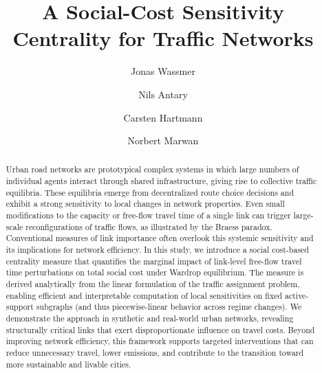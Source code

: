 \documentclass[twocolumn,english,groupedaddress, superscriptaddress,aps,pre,10pt,floatfix]{revtex4-2}
\providecommand{\DIFaddbegin}{} %
\providecommand{\DIFaddend}{} %
\providecommand{\DIFdelbegin}{} %
\providecommand{\DIFdelend}{} %
\newcommand{\DIFscaledelfig}{0.5}
\newlength{\DIFdelgraphicswidth} %
\newlength{\DIFdelgraphicsheight} %
\newcommand{\DIFaddincludegraphics}[2][]{{\color{blue}\fbox{\DIFOincludegraphics[#1]{#2}}}} %
\newcommand{\DIFdelincludegraphics}[2][]{%
\sbox{\DIFdelgraphicsbox}{\DIFOincludegraphics[#1]{#2}}%
\settoboxwidth{\DIFdelgraphicswidth}{\DIFdelgraphicsbox} %
\settoboxtotalheight{\DIFdelgraphicsheight}{\DIFdelgraphicsbox} %
\scalebox{\DIFscaledelfig}{%
\parbox[b]{\DIFdelgraphicswidth}{\usebox{\DIFdelgraphicsbox}\\[-\baselineskip] \rule{\DIFdelgraphicswidth}{0em}}\llap{\resizebox{\DIFdelgraphicswidth}{\DIFdelgraphicsheight}{%
\setlength{\unitlength}{\DIFdelgraphicswidth}%
\begin{picture}(1,1)%
\thicklines\linethickness{2pt} %
{\color[rgb]{1,0,0}\put(0,0){\framebox(1,1){}}}%
{\color[rgb]{1,0,0}\put(0,0){\line( 1,1){1}}}%
{\color[rgb]{1,0,0}\put(0,1){\line(1,-1){1}}}%
\end{picture}%
}\hspace*{3pt}}} %
} %
\DeclareRobustCommand{\DIFaddbegin}{\DIFOaddbegin \let\includegraphics\DIFaddincludegraphics} %
\DeclareRobustCommand{\DIFaddend}{\DIFOaddend \let\includegraphics\DIFOincludegraphics} %
\DeclareRobustCommand{\DIFdelbegin}{\DIFOdelbegin \let\includegraphics\DIFdelincludegraphics} %
\DeclareRobustCommand{\DIFdelend}{\DIFOaddend \let\includegraphics\DIFOincludegraphics} %
\begin{document}
\title{A Social-Cost Sensitivity Centrality for Traffic Networks}

\author{Jonas Wassmer}
\author{Nils Antary}
\DIFdelbegin %
\DIFdelend \DIFaddbegin {}
\DIFaddend \author{Carsten Hartmann}
\author{Norbert Marwan}


\begin{abstract}
Urban road networks are prototypical complex systems in which large numbers of individual agents interact through shared infrastructure, giving rise to collective traffic equilibria. These equilibria emerge from decentralized route choice decisions and exhibit a strong sensitivity to local changes in network properties. Even small modifications to the capacity or free-flow travel time of a single link can trigger large-scale reconfigurations of traffic flows, as illustrated by the Braess paradox. Conventional measures of link importance often overlook this systemic sensitivity and its implications for network efficiency. In this study, we introduce a social cost-based centrality measure that quantifies the marginal impact of link-level free-flow travel time perturbations on total social cost under Wardrop equilibrium. The measure is derived analytically from the linear formulation of the traffic assignment problem, enabling efficient and interpretable computation of local sensitivities on fixed active-support subgraphs (and thus piecewise-linear behavior across regime changes). We demonstrate the approach in synthetic and real-world urban networks, revealing structurally critical links that exert disproportionate influence on travel costs. Beyond improving network efficiency, this framework supports targeted interventions that can reduce unnecessary travel, lower emissions, and contribute to the transition toward more sustainable and livable cities.
\end{abstract}
\end{document}
